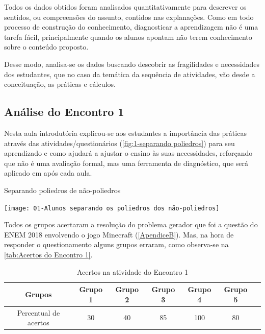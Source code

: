 Todos os dados obtidos foram analisados quantitativamente para descrever os sentidos, ou compreensões do assunto, contidos nas explanações. Como em todo processo de construção do conhecimento, diagnosticar a aprendizagem não é uma tarefa fácil, principalmente quando os alunos apontam não terem conhecimento sobre o conteúdo proposto.

Desse modo, analisa-se os dados buscando descobrir as fragilidades e necessidades dos estudantes, que no caso da temática da sequência de atividades, vão desde a conceituação, as práticas e cálculos.

\subsection{Análise do Encontro 1}

Nesta aula introdutória explicou-se aos estudantes a importância das práticas através das atividades/questionários (\autoref{fig:1-separando poliedros}) para seu aprendizado e como ajudará a ajustar o ensino às suas necessidades, reforçando que não é uma avaliação formal, mas uma ferramenta de diagnóstico, que será aplicado em após cada aula.

\begin{CenteredFigure}
    \caption{Separando poliedros de não-poliedros} \label{fig:1-separando poliedros}
    \texttt{[image: 01-Alunos separando os poliedros dos não-poliedros]}
    \legend{\autoria}
\end{CenteredFigure}

Todos os grupos acertaram a resolução do problema gerador que foi a questão do ENEM 2018 envolvendo o jogo Minecraft (\autoref{ApendiceB}). Mas, na hora de responder o questionamento alguns grupos erraram, como observa-se na \autoref{tab:Acertos do Encontro 1}.

\begin{table}[htbp] \centering
    \caption{Acertos na atividade do Encontro 1} \label{tab:Acertos do Encontro 1}
    \begin{tabular}{|c|c|c|c|c|c|c|}
        \hline
        \textbf{Grupos}       & \textbf{Grupo 1} & \textbf{Grupo 2} & \textbf{Grupo 3} & \textbf{Grupo 4} & \textbf{Grupo 5} \\
        \hline
        Percentual de acertos & 30               & 40               & 85               & 100              & 80               \\
        \hline
    \end{tabular}
    \legend{\legendaTabela}
\end{table}

